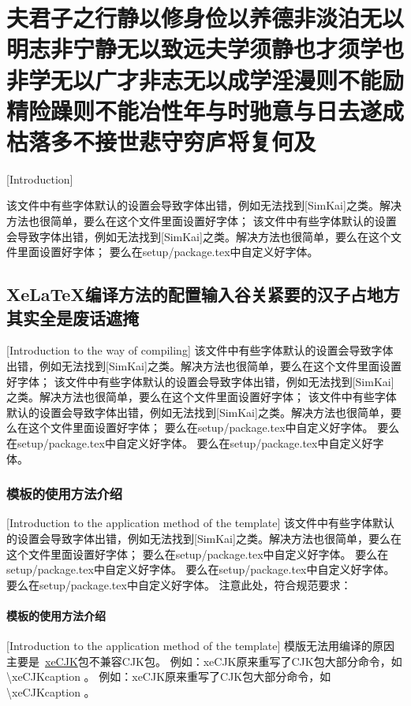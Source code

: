 
\chapter{夫君子之行静以修身俭以养德非淡泊无以明志非宁静无以致远夫学须静也才须学也非学无以广才非志无以成学淫漫则不能励精险躁则不能冶性年与时驰意与日去遂成枯落多不接世悲守穷庐将复何及}[Introduction]

该文件中有些字体默认的设置会导致字体出错，例如无法找到[SimKai]之类。解决方法也很简单，要么在这个文件里面设置好字体；
该文件中有些字体默认的设置会导致字体出错，例如无法找到[SimKai]之类。解决方法也很简单，要么在这个文件里面设置好字体；
要么在setup/package.tex中自定义好字体。
\section{XeLaTeX编译方法的配置输入谷关紧要的汉子占地方其实全是废话遮掩}[Introduction to the \XeLaTeX way of compiling]
该文件中有些字体默认的设置会导致字体出错，例如无法找到[SimKai]之类。解决方法也很简单，要么在这个文件里面设置好字体；
该文件中有些字体默认的设置会导致字体出错，例如无法找到[SimKai]之类。解决方法也很简单，要么在这个文件里面设置好字体；
该文件中有些字体默认的设置会导致字体出错，例如无法找到[SimKai]之类。解决方法也很简单，要么在这个文件里面设置好字体；
要么在setup/package.tex中自定义好字体。
要么在setup/package.tex中自定义好字体。
要么在setup/package.tex中自定义好字体。
\subsection{模板的使用方法介绍}[Introduction to the application method of the template]
该文件中有些字体默认的设置会导致字体出错，例如无法找到[SimKai]之类。解决方法也很简单，要么在这个文件里面设置好字体；
要么在setup/package.tex中自定义好字体。
要么在setup/package.tex中自定义好字体。
要么在setup/package.\cite{kanamori1998shaking}tex中自定义好字体。
要么在setup/package.tex中自定义好字体。
注意此处，符合规范要求：
\subsubsection{模板的使用方法介绍}[Introduction to the application method of the template]
模版无法用\XeLaTeX 编译的原因主要是~\href{http://bay.uchicago.edu/tex-archive/macros/xetex/latex/xecjk/xeCJK.pdf}{xeCJK}包不兼容CJK包。
例如：xeCJK原来重写了CJK包大部分命令，如\textbackslash xeCJKcaption 。
例如：xeCJK原来重写了CJK包大部分命令，如\textbackslash xeCJKcaption 。
